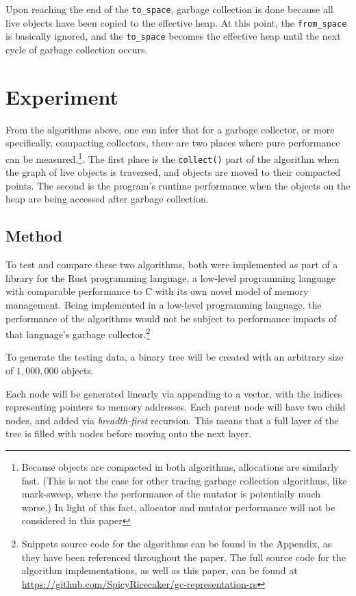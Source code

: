 \documentclass[index]{subfiles}
\begin{document}
Upon reaching the end of the \verb+to_space+, garbage collection is done because all live objects have been copied to the effective heap. At this point, the \verb+from_space+ is basically ignored, and the \verb+to_space+ becomes the effective heap until the next cycle of garbage collection occurs.

\section{Experiment}

From the algorithms above, one can infer that for a garbage collector, or more specifically, compacting collectors, there are two places where pure performance can be measured.\footnote{Because objects are compacted in both algorithms, allocations are similarly fast. (This is not the case for other tracing garbage collection algorithms, like mark-sweep, where the performance of the mutator is potentially much worse.) In light of this fact, allocator and mutator performance will not be considered in this paper}. The first place is the \verb+collect()+ part of the algorithm when the graph of live objects is traversed, and objects are moved to their compacted points. The second is the program's runtime performance when the objects on the heap are being accessed after garbage collection.

\subsection{Method}

To test and compare these two algorithms, both were implemented as part of a library for the Rust programming language, a low-level programming language with comparable performance to C with its own novel model of memory management. Being implemented in a low-level programming language, the performance of the algorithms would not be subject to performance impacts of that language's garbage collector.\footnote{Snippets source code for the algorithms can be found in the Appendix, as they have been referenced throughout the paper. The full source code for the algorithm implementations, as well as this paper, can be found at \href{https://github.com/SpicyRicecaker/gc-representation-rs}{https://github.com/SpicyRicecaker/gc-representation-rs}}

To generate the testing data, a binary tree will be created with an arbitrary size of \(1,000,000\) objects.

Each node will be generated linearly via appending to a vector, with the indices representing pointers to memory addresses. Each parent node will have two child nodes, and added via \textit{breadth-first} recursion. This means that a full layer of the tree is filled with nodes before moving onto the next layer. 
\end{document}
